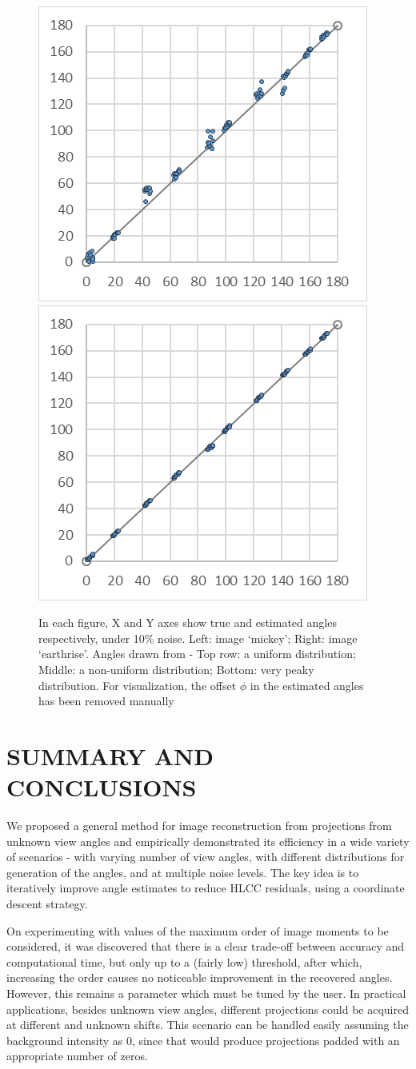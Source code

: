 \documentclass{article}
\begin{document}
\begin{figure}[htb]
  \includegraphics[width=0.4\linewidth]{images/graphs/m-peaky-10pc-100.png}
  \includegraphics[width=0.4\linewidth]{images/graphs/e-peaky-10pc-100.png}
  
  
\caption{In each figure, X and Y axes show true and estimated angles respectively, under 10\% noise. Left: image `mickey'; Right: image `earthrise'.
Angles drawn from - Top row: a uniform distribution; Middle: a non-uniform distribution; Bottom: very peaky distribution.
For visualization, the offset $\phi$ in the estimated angles has been removed manually}
\label{fig:graphs}
\end{figure}

\section{SUMMARY AND CONCLUSIONS}
\label{sec:conclusions}
We proposed a general method for image reconstruction from projections from unknown view angles and empirically demonstrated its efficiency in a wide variety of scenarios - with varying number of view angles, with different distributions for generation of the angles, and at multiple noise levels. The key idea is to iteratively improve angle estimates to reduce HLCC residuals, using a coordinate descent strategy.

On experimenting with values of the maximum order of image moments to be considered, it was discovered that there is a clear trade-off between accuracy and computational time, but only up to a (fairly low) threshold, after which, increasing the order causes no noticeable improvement in the recovered angles. However, this remains a parameter which must be tuned by the user. In practical applications, besides unknown view angles, different projections could be acquired at different and unknown shifts. This scenario can be handled easily assuming the background intensity as 0, since that would produce projections padded with an appropriate number of zeros.   
\end{document}
